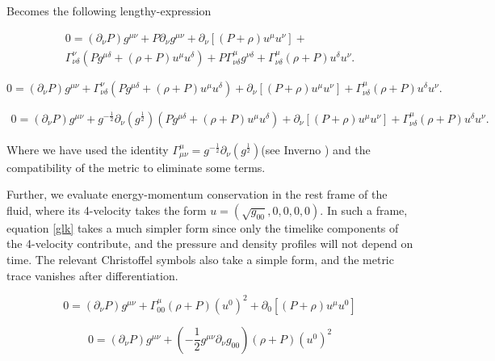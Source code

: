 Becomes the following lengthy-expression

\begin{equation}
\begin{matrix}
0 = (\partial_\nu P) g^{\mu \nu} + P \partial_\nu g^{\mu \nu} +\partial_\nu \left[ (P+\rho) u^\mu u^\nu \right]+ \\ \Gamma^\nu_{\nu \delta}(P g^{\mu \delta} + (\rho+P)u^\mu u^\delta ) + P \Gamma^\mu_{\nu \delta} g^{\nu \delta} +\Gamma^\mu_{\nu \delta} (\rho+ P) u^\delta u^\nu.
\end{matrix}
\end{equation}

\begin{equation}
0 = (\partial_\nu P) g^{\mu \nu} + \Gamma^\nu_{\nu \delta}(P g^{\mu \delta} + (\rho+P)u^\mu u^\delta ) + \partial_\nu \left[ (P+\rho) u^\mu u^\nu \right]+ \Gamma^\mu_{\nu \delta} (\rho+ P) u^\delta u^\nu.
\end{equation}

\begin{equation}\label{glk}
\begin{matrix}
0 = (\partial_\nu P) g^{\mu \nu} + g^{-\frac{1}{2}}\partial_\nu(g^{\frac{1}{2}})  (P g^{\mu \delta} + (\rho+P)u^\mu u^\delta ) + \partial_\nu \left[ (P+\rho) u^\mu u^\nu \right]+ \Gamma^\mu_{\nu \delta} (\rho+ P) u^\delta u^\nu.
\end{matrix}
\end{equation}

Where we have used the identity $\Gamma^\mu_{\mu \nu}=g^{-\frac{1}{2}}\partial_\nu(g^{\frac{1}{2}})$(see Inverno \cite[chapter 7]{inverno}) and the compatibility of the metric to eliminate some terms. 

Further, we evaluate energy-momentum conservation in the rest frame of the fluid, where its 4-velocity takes the form $u=(\sqrt{g_{00}},0,0,0,0)$. In such a frame, equation \ref{glk} takes a much simpler form since only the timelike components of the 4-velocity contribute, and the pressure and density profiles will not depend on time. The relevant Christoffel symbols also take a simple form, and the metric trace vanishes after differentiation. 

\begin{equation}
0 = (\partial_\nu P) g^{\mu \nu} + \Gamma^\mu_{00} (\rho+ P) (u^0)^2 + \partial_0 \left[ (P+\rho) u^\mu u^0 \right]
\end{equation}

\begin{equation}
0 = (\partial_\nu P) g^{\mu \nu} + \left(-\frac{1}{2}g^{\mu \nu} \partial_\nu g_{00} \right) (\rho+ P) (u^0)^2 
\end{equation}

